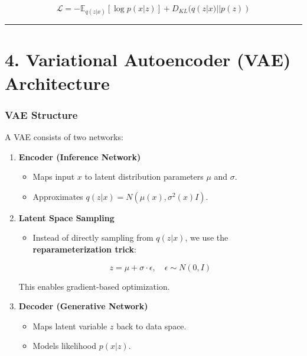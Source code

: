 \documentclass[
]{book}
\providecommand{\tightlist}{%
  \setlength{\itemsep}{0pt}\setlength{\parskip}{0pt}}
\begin{document}
\[
\mathcal{L} = - \mathbb{E}_{q(z|x)} [\log p(x | z)] + D_{KL}(q(z | x) || p(z))
\]

\begin{center}\rule{0.5\linewidth}{0.5pt}\end{center}

\chapter{4. Variational Autoencoder (VAE) Architecture}\label{variational-autoencoder-vae-architecture}

\subsection{\texorpdfstring{\textbf{VAE Structure}}{VAE Structure}}\label{vae-structure}

A VAE consists of two networks:

\begin{enumerate}
\def\labelenumi{\arabic{enumi}.}
\item
  \textbf{Encoder (Inference Network)}

  \begin{itemize}
  \tightlist
  \item
    Maps input \(x\) to latent distribution parameters \(\mu\) and \(\sigma\).
  \item
    Approximates \(q(z | x) = N(\mu(x), \sigma^2(x)I)\).
  \end{itemize}
\item
  \textbf{Latent Space Sampling}

  \begin{itemize}
  \tightlist
  \item
    Instead of directly sampling from \(q(z | x)\), we use the \textbf{reparameterization trick}:
  \end{itemize}

  \[
  z = \mu + \sigma \cdot \epsilon, \quad \epsilon \sim N(0, I)
  \]

  This enables gradient-based optimization.
\item
  \textbf{Decoder (Generative Network)}

  \begin{itemize}
  \tightlist
  \item
    Maps latent variable \(z\) back to data space.
  \item
    Models likelihood \(p(x | z)\).
  \end{itemize}
\end{enumerate}
\end{document}
